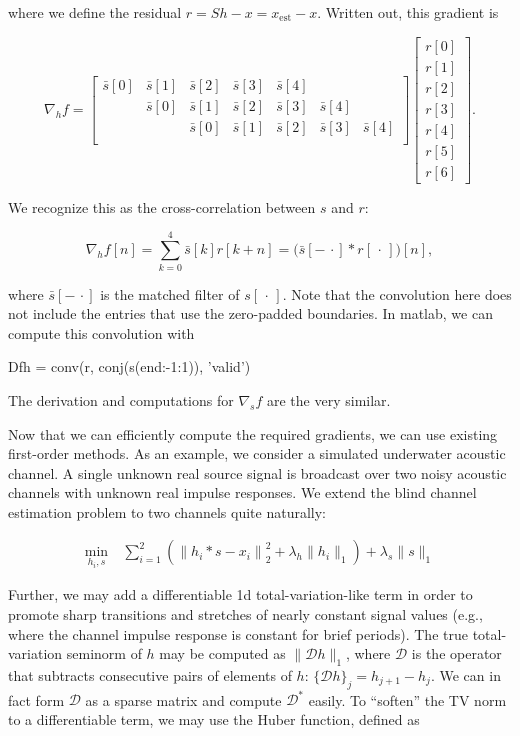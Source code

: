 \documentclass[journal]{IEEEtran}
\begin{document}
\noindent where we define the residual $r=Sh-x = x_\text{est}-x$.  Written out, this gradient is

\[ \nabla_h f = \begin{bmatrix} \bar{s}[0]&\bar{s}[1]&\bar{s}[2]&\bar{s}[3]&\bar{s}[4]\\&\bar{s}[0]&\bar{s}[1]&\bar{s}[2]&\bar{s}[3]&\bar{s}[4]\\&&\bar{s}[0]&\bar{s}[1]&\bar{s}[2]&\bar{s}[3]&\bar{s}[4]\\\end{bmatrix}\begin{bmatrix}r[0]\\r[1]\\r[2]\\r[3]\\r[4]\\r[5]\\r[6]\end{bmatrix}. \] 

\noindent We recognize this as the cross-correlation between $s$ and $r$:

\[ \nabla_h f[n] = \sum_{k=0}^4 \bar{s}[k]r[k+n] = \big(\bar{s}[{-\,\cdot}]\ast r[\,\cdot\,]\big)[n], \]

\noindent where $\bar{s}[{-\,\cdot}]$ is the matched filter of $s[\,\cdot\,]$.  Note that the convolution here does not include the entries that use the zero-padded boundaries.  In {\sc matlab}, we can compute this convolution with

\begin{verb}
  Dfh = conv(r, conj(s(end:-1:1)), 'valid')
\end{verb}

\noindent The derivation and computations for $\nabla_sf$ are the very similar.

Now that we can efficiently compute the required gradients, we can use existing first-order methods.  As an example, we consider a simulated underwater acoustic channel.  A single unknown real source signal is broadcast over two noisy acoustic channels with unknown real impulse responses.  We extend the blind channel estimation problem to two channels quite naturally:

\begin{align*}
   \min_{h_i,s} ~&\sum_{i=1}^2\left(\left\|h_i\ast s - x_i\right\|_2^2 + \lambda_{h}\|h_i\|_1\right) + \lambda_s\|s\|_1
\end{align*}

\noindent Further, we may add a differentiable 1d total-variation-like term in order to promote sharp transitions and stretches of nearly constant signal values (e.g., where the channel impulse response is constant for brief periods).  The true total-variation seminorm of $h$ may be computed as $\|\mathcal{D}h\|_1$, where $\mathcal{D}$ is the operator that subtracts consecutive pairs of elements of $h$: $\{\mathcal{D}h\}_j = h_{j+1} - h_j$.  We can in fact form $\mathcal{D}$ as a sparse matrix and compute $\mathcal{D}^\ast$ easily.  To ``soften'' the TV norm to a differentiable term, we may use the Huber function, defined as
\end{document}
